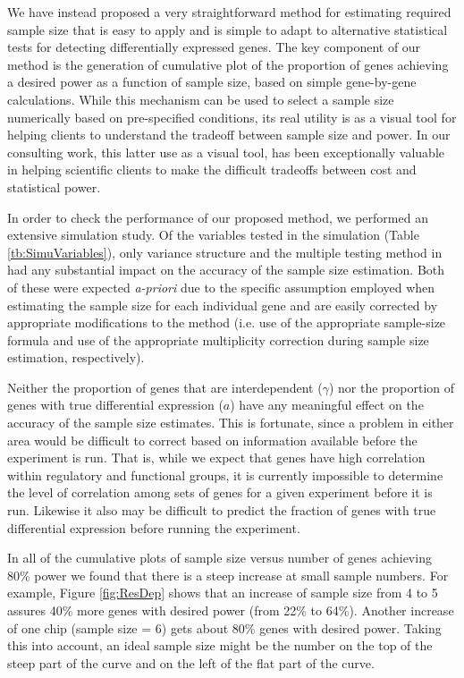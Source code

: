 \documentclass{bioinfo}
\begin{document}
We have instead proposed a very straightforward method for
estimating required sample size that is easy to apply and is
simple to adapt to alternative statistical tests for detecting
differentially expressed genes. The key component of our method is
the generation of cumulative plot of the proportion of genes
achieving a desired power as a function of sample size, based on
simple gene-by-gene calculations.  While this mechanism can be
used to select a sample size numerically based on pre-specified
conditions, its real utility is as a visual tool for helping
clients to understand the tradeoff between sample size and power.
In our consulting work, this latter use as a visual tool, has been
exceptionally valuable in helping scientific clients to make the
difficult tradeoffs between cost and statistical power.

In order to check the performance of our proposed method, we
performed an extensive simulation study. Of the variables tested in
the simulation (Table \ref{tb:SimuVariables}), only variance
structure and the multiple testing method in had any substantial
impact on the accuracy of the sample size estimation.  Both of these
were expected \textit{a-priori }due to the specific assumption
employed when estimating the sample size for each individual gene
and are easily corrected by appropriate modifications to the method
(i.e. use of the appropriate sample-size formula and use of the
appropriate multiplicity correction during sample size estimation,
respectively).

Neither the proportion of genes that are interdependent ($\gamma$)
nor the proportion of genes with true differential expression
($a$) have any meaningful effect on the accuracy of the sample
size estimates.  This is fortunate, since a problem in either area
would be difficult to correct based on information available
before the experiment is run.  That is, while we expect that genes
have high correlation within regulatory and functional groups, it
is currently impossible to determine the level of correlation
among sets of genes for a given experiment before it is run.
Likewise it also may be difficult to predict the fraction of genes
with true differential expression before running the experiment.

In all of the cumulative plots of sample size versus number of
genes achieving 80\% power we found that there is a steep increase
at small sample numbers. For example, Figure \ref{fig:ResDep}
shows that an increase of sample size from 4 to 5 assures 40\%
more genes with desired power (from 22\% to 64\%).  Another
increase of one chip (sample size = 6) gets about 80\% genes with
desired power. Taking this into account, an ideal sample size
might be the number on the top of the steep part of the curve and
on the left of the flat part of the curve.
\end{document}
